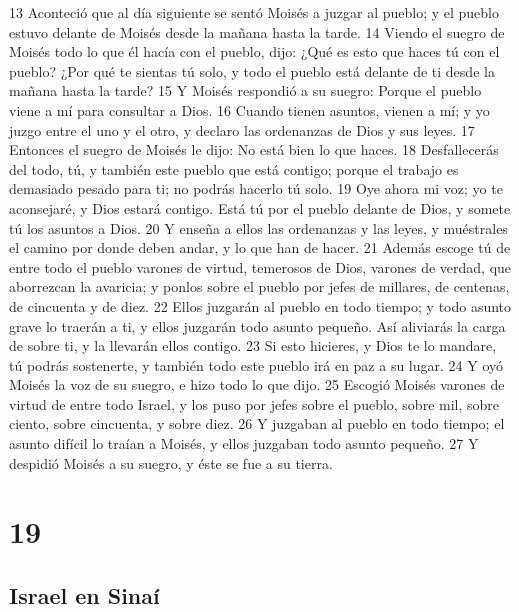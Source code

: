 13 Aconteció que al día siguiente se sentó Moisés a juzgar al pueblo; y el pueblo estuvo delante de Moisés desde la mañana hasta la tarde.
14 Viendo el suegro de Moisés todo lo que él hacía con el pueblo, dijo: ¿Qué es esto que haces tú con el pueblo? ¿Por qué te sientas tú solo, y todo el pueblo está delante de ti desde la mañana hasta la tarde?
15 Y Moisés respondió a su suegro: Porque el pueblo viene a mí para consultar a Dios.
16 Cuando tienen asuntos, vienen a mí; y yo juzgo entre el uno y el otro, y declaro las ordenanzas de Dios y sus leyes.
17 Entonces el suegro de Moisés le dijo: No está bien lo que haces.
18 Desfallecerás del todo, tú, y también este pueblo que está contigo; porque el trabajo es demasiado pesado para ti; no podrás hacerlo tú solo.
19 Oye ahora mi voz; yo te aconsejaré, y Dios estará contigo. Está tú por el pueblo delante de Dios, y somete tú los asuntos a Dios.
20 Y enseña a ellos las ordenanzas y las leyes, y muéstrales el camino por donde deben andar, y lo que han de hacer.
21 Además escoge tú de entre todo el pueblo varones de virtud, temerosos de Dios, varones de verdad, que aborrezcan la avaricia; y ponlos sobre el pueblo por jefes de millares, de centenas, de cincuenta y de diez.
22 Ellos juzgarán al pueblo en todo tiempo; y todo asunto grave lo traerán a ti, y ellos juzgarán todo asunto pequeño. Así aliviarás la carga de sobre ti, y la llevarán ellos contigo.
23 Si esto hicieres, y Dios te lo mandare, tú podrás sostenerte, y también todo este pueblo irá en paz a su lugar.
24 Y oyó Moisés la voz de su suegro, e hizo todo lo que dijo.
25 Escogió Moisés varones de virtud de entre todo Israel, y los puso por jefes sobre el pueblo, sobre mil, sobre ciento, sobre cincuenta, y sobre diez.
26 Y juzgaban al pueblo en todo tiempo; el asunto difícil lo traían a Moisés, y ellos juzgaban todo asunto pequeño.
27 Y despidió Moisés a su suegro, y éste se fue a su tierra.

\chapter{19}

\section{Israel en Sinaí}

